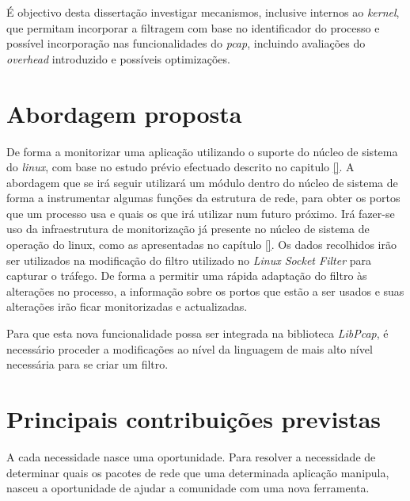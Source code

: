 É objectivo desta dissertação investigar mecanismos, inclusive internos ao \textit{kernel}, que permitam incorporar a filtragem com base no identificador do processo e possível incorporação nas funcionalidades do \textit{pcap}, incluindo avaliações do \textit{overhead} introduzido e possíveis optimizações.

\section{Abordagem proposta}\label{sec:abordagem_proposta}
De forma a monitorizar uma aplicação utilizando o suporte do núcleo de sistema do \textit{linux}, com base no estudo prévio efectuado descrito no capitulo \ref{}.
A abordagem que se irá seguir utilizará um módulo dentro do núcleo de sistema de forma a instrumentar algumas funções da estrutura de rede, para obter os portos que um processo usa e quais os que irá utilizar num futuro próximo.
Irá fazer-se uso da infraestrutura de monitorização já presente no núcleo de sistema de operação do linux, como as apresentadas no capítulo \ref{}.
Os dados recolhidos irão ser utilizados na modificação do filtro utilizado no \textit{Linux Socket Filter} para capturar o tráfego.
De forma a permitir uma rápida adaptação do filtro às alterações no processo, a informação sobre os portos que estão a ser usados e suas alterações irão ficar monitorizadas e actualizadas.

Para que esta nova funcionalidade possa ser integrada na biblioteca \textit{LibPcap}, é necessário proceder a modificações ao nível da linguagem de mais alto nível necessária para se criar um filtro.

\section{Principais contribuições previstas} \label{sect:contribuicoes}


A cada necessidade nasce uma oportunidade.
Para resolver a necessidade de determinar quais os pacotes de rede que uma determinada aplicação manipula, nasceu a oportunidade de ajudar a comunidade com uma nova ferramenta.

